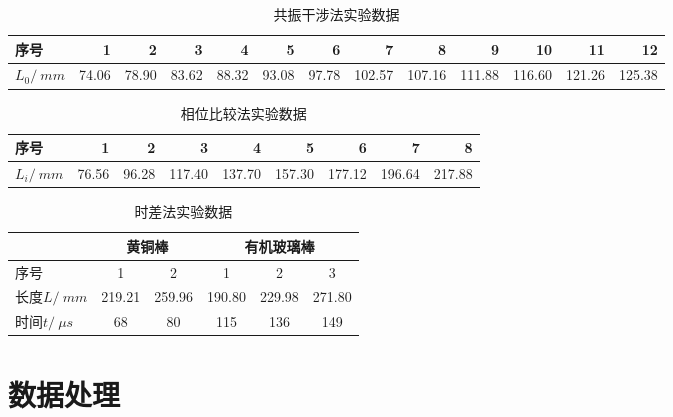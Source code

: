 \documentclass{article}
\begin{document}
\begin{table}[htbp]
    \centering
    \caption{共振干涉法实验数据}
    \begin{tabular}{|l|r|r|r|r|r|r|r|r|r|r|r|r|}
        \hline
        序号              & 1     & 2     & 3     & 4     & 5     & 6     & 7      & 8      & 9      & 10     & 11     & 12 \bigstrut     \\
        \hline
        $L_0/\SI{}{mm}$ & 74.06 & 78.90 & 83.62 & 88.32 & 93.08 & 97.78 & 102.57 & 107.16 & 111.88 & 116.60 & 121.26 & 125.38 \bigstrut \\
        \hline
    \end{tabular}%
\end{table}%
\begin{table}[htbp]
    \centering
    \caption{相位比较法实验数据}
    \begin{tabular}{|l|r|r|r|r|r|r|r|r|}
        \hline
        序号              & 1     & 2     & 3      & 4      & 5      & 6      & 7      & 8 \bigstrut      \\
        \hline
        $L_i/\SI{}{mm}$ & 76.56 & 96.28 & 117.40 & 137.70 & 157.30 & 177.12 & 196.64 & 217.88 \bigstrut \\
        \hline
    \end{tabular}%
\end{table}%
\begin{table}[htbp]
    \centering
    \caption{时差法实验数据}
    \begin{tabular}{|l|cc|ccc|}
        \hline
           & \multicolumn{2}{c|}{黄铜棒} & \multicolumn{3}{c|}{有机玻璃棒} \bigstrut                                      \\
        \hline
        序号 & 1                        & 2                                  & 1      & 2      & 3                \\
        \hline
        长度$L/\SI{}{mm}$ & 219.21                   & 259.96                             & 190.80 & 229.98 & 271.80 \bigstrut \\
        \hline
        时间$t/\SI{}{\mu s}$ & 68                       & 80                                 & 115    & 136    & 149 \bigstrut    \\
        \hline
    \end{tabular}%
\end{table}%

\section*{数据处理}
\end{document}
